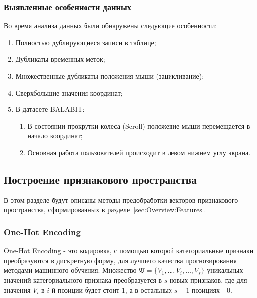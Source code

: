 \documentclass[12pt]{article}
\begin{document}
    \subsubsection{Выявленные особенности данных}
    \label{sec:Research:Data:Features}

    Во время анализа данных были обнаружены следующие особенности:
    \begin{enumerate}
        \item Полностью дублирующиеся записи в таблице;
        \item Дубликаты временных меток;
        \item Множественные дубликаты положения мыши (зацикливание);
        \item Сверхбольшие значения координат;
        \item В датасете BALABIT:
        \begin{enumerate}
            \item В состоянии прокрутки колеса (Scroll) положение мыши перемещается в начало координат;
            \item Основная работа пользователей происходит в левом нижнем углу экрана.
        \end{enumerate}
    \end{enumerate}


    \subsection{Построение признакового пространства}
    \label{sec:Research:FeatureSpace}

    \par В этом разделе будут описаны методы предобработки векторов признакового пространства, сформированных в разделе~\ref{sec:Overview:Features}.

    \subsubsection{One-Hot Encoding}
    \label{sec:Research:FeatureSpace:OneHotEncoding}

    \par One-Hot Encoding - это кодировка, с помощью которой категориальные признаки преобразуются в дискретную форму, для лучшего качества прогнозирования методами машинного обучения. Множество $ \mathfrak{V} = \{V_1, \ldots, V_i, \ldots, V_s\} $ уникальных значений категориального признака преобразуется в $s$ новых признаков, где для значения $V_i$ в $i$-й позиции будет стоит 1, а в остальных $s-1$ позициях - 0. \\
\end{document}
